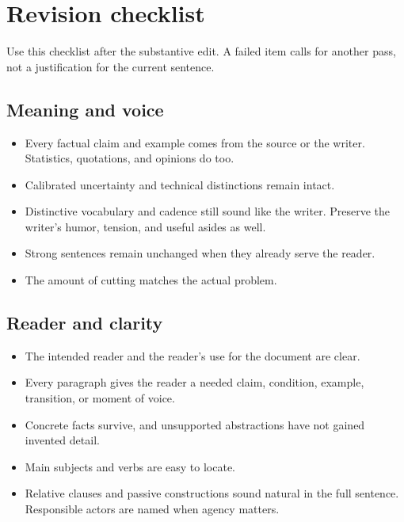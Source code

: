 \section{Revision checklist}
\label{app:checklist}

Use this checklist after the substantive edit. A failed item calls for another
pass, not a justification for the current sentence.

\subsection{Meaning and voice}

\begin{itemize}[leftmargin=*,label=\(\square\)]
    \item Every factual claim and example comes from the source or the writer.
    Statistics, quotations, and opinions do too.
    \item Calibrated uncertainty and technical distinctions remain intact.
    \item Distinctive vocabulary and cadence still sound like the writer.
    Preserve the writer's humor, tension, and useful asides as well.
    \item Strong sentences remain unchanged when they already serve the
    reader.
    \item The amount of cutting matches the actual problem.
\end{itemize}

\subsection{Reader and clarity}

\begin{itemize}[leftmargin=*,label=\(\square\)]
    \item The intended reader and the reader's use for the document are clear.
    \item Every paragraph gives the reader a needed claim, condition, example,
    transition, or moment of voice.
    \item Concrete facts survive, and unsupported abstractions have not gained
    invented detail.
    \item Main subjects and verbs are easy to locate.
    \item Relative clauses and passive constructions sound natural in the full
    sentence. Responsible actors are named when agency matters.
\end{itemize}

